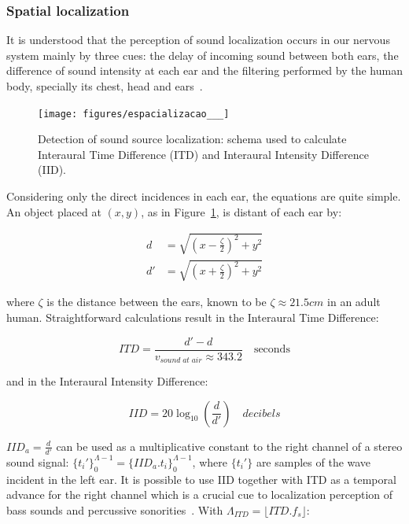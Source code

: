 \subsubsection{Spatial localization}
It is understood that the perception of sound localization occurs in our nervous system mainly by three cues: the delay of incoming sound between both ears, the difference of sound intensity at each ear and the filtering performed by the human body, specially its chest, head and ears~\cite{Roederer, hrtf, Heeger}. 

\begin{figure}[h!]
    \centering
        \texttt{[image: figures/espacializacao\_\_\_]}
    \caption{Detection of sound source localization: schema used to calculate Interaural Time Difference (ITD) and Interaural Intensity Difference (IID).}
    \label{fig:spac}
\end{figure}

Considering only the direct incidences in each ear, the equations are quite simple. An object placed at $(x,y)$, as in Figure~\ref{fig:spac}, is distant of each ear by:

\begin{equation}\label{eq:distOuvidos}
\begin{split}
d & =\sqrt{\left (x-\frac{\zeta}{2} \right )^2+y^2} \\
d' & =\sqrt{\left (x+\frac{\zeta}{2} \right )^2 + y^2}
\end{split}
\end{equation}

\noindent where $\zeta$ is the distance between the ears, known to be $\zeta \approx 21.5cm$ in an adult human. Straightforward calculations result in the Interaural Time Difference:

\begin{equation}\label{eq:dti}
ITD=\frac{d'-d}{v_{sound\;at\;air}\approx 343.2 }\quad \text{seconds}
\end{equation}

\noindent and in the Interaural Intensity Difference:

\begin{equation}\label{eq:dii}
IID=20\log_{10}\left (\frac{d}{d'}\right) \quad decibels
\end{equation}

$IID_a=\frac{d}{d'}$ can be used as a multiplicative constant to the right channel of a stereo sound signal: $\{t_i'\}_0^{\Lambda -1}=\{IID_a . t_i\}_0^{\Lambda -1}$, where $\{t_i'\}$ are samples of the wave incident in the left ear. It is possible to use IID together with ITD as a temporal advance for the right channel which is a crucial cue to localization perception of bass sounds and percussive sonorities~\cite{Heeger}. 
With $\Lambda_{ITD}=\lfloor ITD . f_s \rfloor$:

